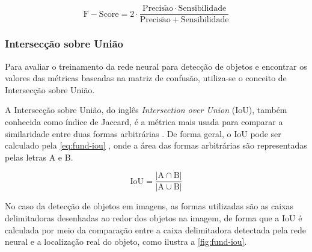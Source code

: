 \begin{equation} \label{eq:fund-fscore}
\mathrm{
  F-Score = 2 \cdot \frac{Precis\tilde{a}o \cdot Sensibilidade}{Precis\tilde{a}o + Sensibilidade}
}
\end{equation}

\subsubsection{Intersecção sobre União} \label{cap:fund-ia-metricas-iou}
Para avaliar o treinamento da rede neural para detecção de objetos e encontrar os valores das métricas baseadas na matriz de confusão, utiliza-se o conceito de Intersecção sobre União.

A Intersecção sobre União, do inglês \textit{Intersection over Union} (IoU), também conhecida como índice de Jaccard, é a métrica mais  usada para comparar a similaridade entre duas formas arbitrárias \cite{ref:Rezatofighi-et-al}. De forma geral, o IoU pode ser calculado pela \autoref{eq:fund-iou} \cite{ref:Rezatofighi-et-al}, onde a área das formas arbitrárias são representadas pelas letras A e B.

\begin{equation} \label{eq:fund-iou}
\mathrm{
  IoU = \frac{|A \cap B|}{|A \cup B|}
}
\end{equation}

No caso da detecção de objetos em imagens, as formas utilizadas são as caixas delimitadoras desenhadas ao redor dos objetos na imagem, de forma que a IoU é calculada por meio da comparação entre a caixa delimitadora detectada pela rede neural e a localização real do objeto, como ilustra a \autoref{fig:fund-iou}.

